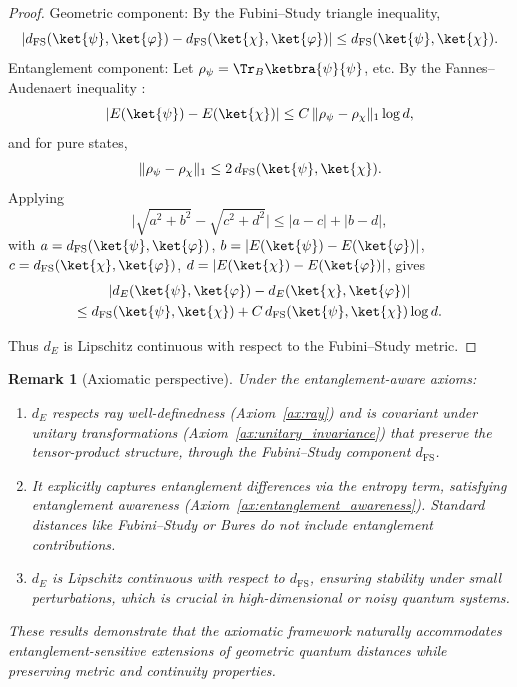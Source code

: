 \documentclass[aps,pra,reprint,nofootinbib,showpacs,superscriptaddress]{revtex4-1}
\newtheorem{remark}[theorem]{Remark}
\begin{document}
\begin{proof}
{Geometric component:} By the Fubini–Study triangle inequality,
\[
|d_{\text{FS}}(\ket{\psi},\ket{\varphi}) - d_{\text{FS}}(\ket{\chi},\ket{\varphi})| \le d_{\text{FS}}(\ket{\psi},\ket{\chi}).
\]
Entanglement component: Let $\rho_\psi = \Tr_B \ketbra{\psi}{\psi}$, etc. By the Fannes–Audenaert inequality \cite{audenaert2007sharp}:
\[
|E(\ket{\psi}) - E(\ket{\chi})| \le C \, \|\rho_\psi - \rho_\chi\|_1 \log d,
\]
and for pure states,
\[
\|\rho_\psi - \rho_\chi\|_1 \le 2 \, d_{\text{FS}}(\ket{\psi},\ket{\chi}).
\]
Applying
\[
\big|\sqrt{a^2 + b^2} - \sqrt{c^2 + d^2}\big| \le |a-c| + |b-d|,
\]
with $a = d_{\text{FS}}(\ket{\psi},\ket{\varphi})$, $b = |E(\ket{\psi}) - E(\ket{\varphi})|$, $c = d_{\text{FS}}(\ket{\chi},\ket{\varphi})$, $d = |E(\ket{\chi}) - E(\ket{\varphi})|$, gives
\begin{multline}\notag 
|d_E(\ket{\psi},\ket{\varphi}) - d_E(\ket{\chi},\ket{\varphi})| \\\le d_{\text{FS}}(\ket{\psi},\ket{\chi}) + C \, d_{\text{FS}}(\ket{\psi},\ket{\chi}) \log d.
\end{multline}

Thus $d_E$ is Lipschitz continuous with respect to the Fubini–Study metric.
\end{proof}

\begin{remark}[Axiomatic perspective]
Under the entanglement-aware axioms:

\begin{enumerate}[label=(\roman*)]
    \item $d_E$ respects ray well-definedness (Axiom~\ref{ax:ray}) and is covariant under unitary transformations (Axiom~\ref{ax:unitary_invariance}) that preserve the tensor-product structure, through the Fubini–Study component $d_{\text{FS}}$.
    \item It explicitly captures entanglement differences via the entropy term, satisfying entanglement awareness (Axiom~\ref{ax:entanglement_awareness}). Standard distances like Fubini–Study or Bures do not include entanglement contributions.
    \item $d_E$ is Lipschitz continuous with respect to $d_{\text{FS}}$, ensuring stability under small perturbations, which is crucial in high-dimensional or noisy quantum systems.
\end{enumerate}
These results demonstrate that the axiomatic framework naturally accommodates entanglement-sensitive extensions of geometric quantum distances while preserving metric and continuity properties.
\end{remark}
\end{document}
